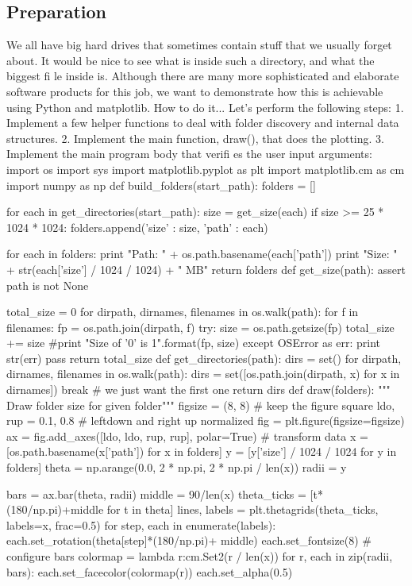 \subsection{Preparation}
We all have big hard drives that sometimes contain stuff that we usually forget about. It would
be nice to see what is inside such a directory, and what the biggest fi le inside is.
Although there are many more sophisticated and elaborate software products for this job,
we want to demonstrate how this is achievable using Python and matplotlib.
How to do it...
Let's perform the following steps:
1. Implement a few helper functions to deal with folder discovery and internal
data structures.
2. Implement the main function, draw(), that does the plotting.
3. Implement the main program body that verifi es the user input arguments:
import os
import sys
import matplotlib.pyplot as plt
import matplotlib.cm as cm
import numpy as np
def build_folders(start_path):
 folders = []

 for each in get_directories(start_path):
 size = get_size(each)
 if size >= 25 * 1024 * 1024:
 folders.append({'size' : size, 'path' : each})

 for each in folders:
 print "Path: " + os.path.basename(each['path'])
 print "Size: " + str(each['size'] / 1024 / 1024) + " MB"
 return folders
def get_size(path):
 assert path is not None

 total_size = 0
 for dirpath, dirnames, filenames in os.walk(path):
 for f in filenames:
 fp = os.path.join(dirpath, f)
 try:
 size = os.path.getsize(fp)
 total_size += size
 #print "Size of '{0}' is {1}".format(fp, size)
 except OSError as err:
 print str(err)
 pass
 return total_size
def get_directories(path):
 dirs = set()
 for dirpath, dirnames, filenames in os.walk(path):
 dirs = set([os.path.join(dirpath, x) for x in dirnames])
 break # we just want the first one
 return dirs
def draw(folders):
 """ Draw folder size for given folder"""
 figsize = (8, 8) # keep the figure square
 ldo, rup = 0.1, 0.8 # leftdown and right up normalized
 fig = plt.figure(figsize=figsize)
 ax = fig.add_axes([ldo, ldo, rup, rup], polar=True)
 # transform data
 x = [os.path.basename(x['path']) for x in folders]
 y = [y['size'] / 1024 / 1024 for y in folders]
 theta = np.arange(0.0, 2 * np.pi, 2 * np.pi / len(x))
 radii = y

 bars = ax.bar(theta, radii)
 middle = 90/len(x)
 theta_ticks = [t*(180/np.pi)+middle for t in theta]
 lines, labels = plt.thetagrids(theta_ticks, labels=x,
frac=0.5)
 for step, each in enumerate(labels):
 each.set_rotation(theta[step]*(180/np.pi)+ middle)
 each.set_fontsize(8)
 # configure bars
 colormap = lambda r:cm.Set2(r / len(x))
 for r, each in zip(radii, bars):
 each.set_facecolor(colormap(r))
 each.set_alpha(0.5)

